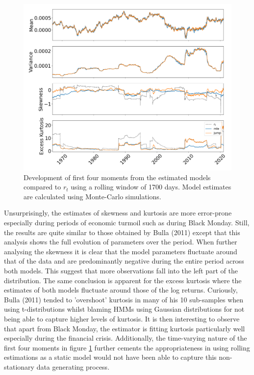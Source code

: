 \begin{figure}[H] 
    \centering
    \includegraphics[width=1.0\textwidth, height = 0.4\textheight]{analysis/stylized_facts/images/moments_regular.png}
    \caption[Development of the first four moments from the estimated models and $r_t$]{Development of first four moments from the estimated models compared to $r_t$ using a rolling window of 1700 days. Model estimates are calculated using Monte-Carlo simulations.}
    \label{fig:stylized_facts_rolling_moments} 
\end{figure}

Unsurprisingly, the estimates of skewness and kurtosis are more error-prone especially during periods of economic turmoil such as during Black Monday. Still, the results are quite similar to those obtained by Bulla (2011) except that this analysis shows the full evolution of parameters over the period. When further analysing the skewness it is clear that the model parameters fluctuate around that of the data and are predominantly negative during the entire period across both models. This suggest that more observations fall into the left part of the distribution. The same conclusion is apparent for the excess kurtosis where the estimates of both models fluctuate around those of the log returns. Curiously, Bulla (2011) tended to 'overshoot' kurtosis in many of his 10 sub-samples when using t-distributions whilst blaming HMMs using Gaussian distributions for not being able to capture higher levels of kurtosis. It is then interesting to observe that apart from Black Monday, the \jump estimator is fitting kurtosis particularly well especially during the financial crisis. Additionally, the time-varying nature of the first four moments in figure \ref{fig:stylized_facts_rolling_moments} further cements the appropriateness in using rolling estimations as a static model would not have been able to capture this non-stationary data generating process.

